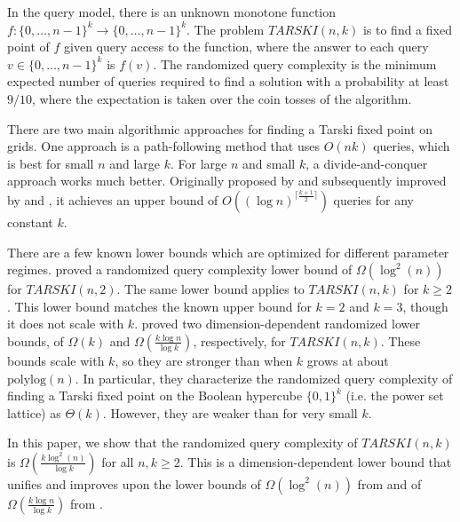 \documentclass[11pt]{article}
\begin{document}
In the query model,  there is an unknown monotone function $f:\{0, \ldots, n-1\}^k \to \{0, \ldots, n-1\}^k$. The problem $TARSKI(n, k)$ is to find a fixed point of $f$ given query access to the function, where the answer to each query $v \in \{0, \ldots, n-1\}^k$ is $f(v)$. The randomized query complexity is the minimum  expected number of queries required to find a solution with a probability at least $9/10$, where the expectation is taken over the coin tosses of the algorithm. 

There are two main algorithmic approaches for finding a Tarski fixed point on grids. One approach is a path-following method that uses $O(nk)$ queries, which is best for small $n$ and large $k$. For large $n$ and small $k$, a divide-and-conquer approach works much better. Originally proposed by \cite{dang2011computational} and subsequently improved by \cite{fearnley2022faster} and \cite{chen2022improved}, it achieves an upper bound of $O\left((\log{n})^{\lceil \frac{k+1}{2} \rceil}\right)$ queries for any constant $k$. 

There are a few known lower bounds which are optimized for different parameter regimes. \cite{etessami2019tarski} proved a randomized query complexity lower bound of $\Omega\left(\log^2(n)\right)$ for $TARSKI(n, 2)$. The same lower bound applies to $TARSKI(n, k)$ for $k \geq 2$. This lower bound matches the known upper bound for $k=2$ and $k=3$, though it does not scale with $k$.
\cite{BPR24} proved two dimension-dependent randomized  lower bounds, of $\Omega(k)$ and $\Omega\left(\frac{k \log n}{\log k}\right)$, respectively, for $TARSKI(n, k)$. These bounds scale with $k$, so they are stronger than \cite{etessami2019tarski} when $k$ grows at about $\text{polylog}(n)$. In particular, they characterize the randomized query complexity of finding a Tarski fixed point on the Boolean hypercube $\{0,1\}^k$ (i.e. the power set lattice) as $\Theta(k)$. However, they are weaker than \cite{etessami2019tarski} for very small $k$. %


In this paper, we show that the randomized query complexity of $TARSKI(n, k)$ is $\Omega\left(\frac{k \log^2(n)}{\log k}\right)$ for all $n,k \geq 2$.
This is a dimension-dependent lower bound that unifies and improves upon the  lower bounds of $\Omega\left(\log^2(n)\right)$  from \cite{etessami2019tarski} and  of $\Omega\left(\frac{k \log n}{\log k}\right)$ from \cite{BPR24}.
\end{document}
